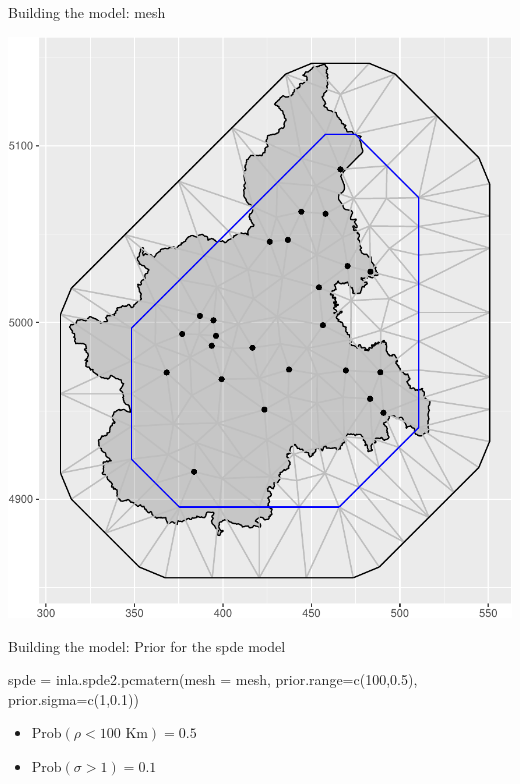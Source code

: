 \documentclass[
  ignorenonframetext,
]{beamer}
\newenvironment{Shaded}{\begin{snugshade}}{\end{snugshade}}
\newcommand{\AttributeTok}[1]{\textcolor[rgb]{0.77,0.63,0.00}{#1}}
\newcommand{\DecValTok}[1]{\textcolor[rgb]{0.00,0.00,0.81}{#1}}
\newcommand{\FloatTok}[1]{\textcolor[rgb]{0.00,0.00,0.81}{#1}}
\newcommand{\FunctionTok}[1]{\textcolor[rgb]{0.00,0.00,0.00}{#1}}
\newcommand{\NormalTok}[1]{#1}
\newcommand{\OtherTok}[1]{\textcolor[rgb]{0.56,0.35,0.01}{#1}}
\begin{document}
\begin{frame}{Building the model: mesh}
\protect\hypertarget{building-the-model-mesh}{}
\begin{center}\includegraphics[width=0.6\linewidth]{Part3_Spatial_files/figure-beamer/unnamed-chunk-26-1} \end{center}
\end{frame}

\begin{frame}[fragile]{Building the model: Prior for the spde model}
\protect\hypertarget{building-the-model-prior-for-the-spde-model}{}
\small

\begin{Shaded}
\begin{Highlighting}[]
\NormalTok{spde }\OtherTok{=} \FunctionTok{inla.spde2.pcmatern}\NormalTok{(}\AttributeTok{mesh =}\NormalTok{ mesh,}
                           \AttributeTok{prior.range=}\FunctionTok{c}\NormalTok{(}\DecValTok{100}\NormalTok{,}\FloatTok{0.5}\NormalTok{), }
                           \AttributeTok{prior.sigma=}\FunctionTok{c}\NormalTok{(}\DecValTok{1}\NormalTok{,}\FloatTok{0.1}\NormalTok{)) }
\end{Highlighting}
\end{Shaded}

\normalsize

\begin{itemize}
\item
  \(\text{Prob}(\rho<100\text{ Km}) = 0.5\)
\item
  \(\text{Prob}(\sigma>1) = 0.1\)
\end{itemize}
\end{frame}
\end{document}
